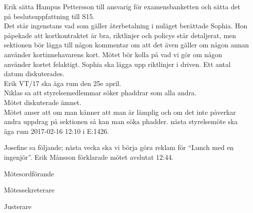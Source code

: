 \documentclass[10pt]{article}
\def\mo{Erik Månsson}
\def\ms{Johan Karlberg}
\def\ji{Daniel Bakic}
\begin{document}
\begin{paragrafer}
Erik \ypa sätta Hampus Pettersson till ansvarig för examensbanketten och sätta det på beslutsuppfattning till S15.\\
\Mbaby
{}
Det står ingenstans vad som gäller återbetalning i nuläget berättade Sophia. Hon påpekade att kortkontraktet är bra, riktlinjer och policys står detaljerat, men sektionen bör lägga till någon kommentar om att det även gäller om någon annan använder kortinnehavarens kort. Mötet bör kolla på vad vi gör om någon använder kortet felaktigt. Sophia ska lägga upp riktlinjer i driven.
Ett antal datum diskuterades.\\
Erik \ypa VT/17 ska äga rum den 25e april.\\
\Mbaby
{}
Niklas sa att styrelsemedlemmar söker phaddrar som alla andra.\\
Mötet diskuterade ämnet.\\
Mötet anser att om man känner att man är lämplig och om det inte påverkar andra uppdrag på sektionen så kan man söka phadder.
{\Mba} nästa styrelsemöte ska äga rum 2017-02-16 12:10 i E:1426.

{\Ibfu}

Josefine sa följande; nästa vecka ska vi börja göra reklam för ``Lunch med en ingenjör''.
{\mo} förklarade mötet avslutat 12:44.

\end{paragrafer}
\newpage
\hidesignfoot
\begin{signatures}{3}
\signature{\mo}{Mötesordförande}
\signature{\ms}{Mötessekreterare}
\signature{\ji}{Justerare}
\end{signatures}
\end{document}
